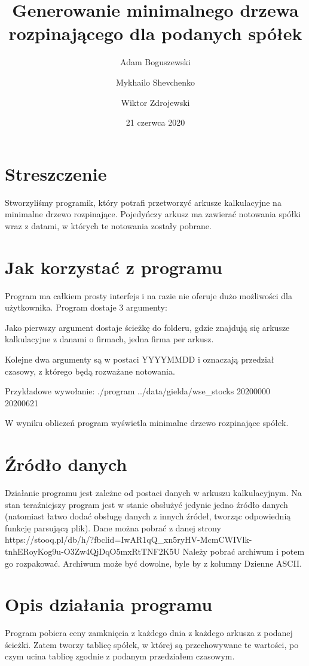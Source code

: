 \documentclass{article}
\title{Generowanie minimalnego drzewa rozpinającego dla podanych spółek}
\author{
    Adam Boguszewski \and
    Mykhailo Shevchenko \and
    Wiktor Zdrojewski
}
\date{21 czerwca 2020}
\begin{document}
\maketitle

\section{Streszczenie}
Stworzyliśmy programik, który potrafi przetworzyć arkusze kalkulacyjne
na minimalne drzewo rozpinające. Pojedyńczy arkusz ma zawierać notowania
spółki wraz z datami, w których te notowania zostały pobrane.

\section{Jak korzystać z programu}
Program ma całkiem prosty interfejs i na razie nie oferuje dużo możliwości
dla użytkownika. Program dostaje 3 argumenty:

Jako pierwszy argument dostaje ścieżkę do folderu, gdzie
znajdują się arkusze kalkulacyjne z danami o firmach, jedna firma per arkusz.

Kolejne dwa argumenty są w postaci YYYYMMDD i oznaczają przedział czasowy,
z którego będą rozważane notowania.

Przykładowe wywołanie:\newline
./program ../data/gielda/wse\_stocks 20200000 20200621

W wyniku obliczeń program wyświetla minimalne drzewo rozpinające spółek.

\section{Źródło danych}
Działanie programu jest zależne od postaci danych w arkuszu kalkulacyjnym.
Na stan teraźniejszy program jest w stanie obsłużyć jedynie jedno źródło danych
(natomiast łatwo dodać obsługę danych z innych źródeł, tworząc odpowiednią funkcję parsującą plik).
Dane można pobrać z danej strony\newline
https://stooq.pl/db/h/?fbclid=IwAR1qQ\_xn5ryHV-McmCWIVlk-tnhERoyKog9u-O3Zw4QjDqO5mxRtTNF2K5U\newline
Należy pobrać archiwum i potem go rozpakować. Archiwum może być dowolne, byle by z kolumny Dzienne ASCII.

\section{Opis działania programu}
Program pobiera ceny zamknięcia z każdego dnia z każdego arkusza z podanej ścieżki.
Zatem tworzy tablicę spółek, w której są przechowywane te wartości, po czym
ucina tablicę zgodnie z podanym przedziałem czasowym.
\end{document}
